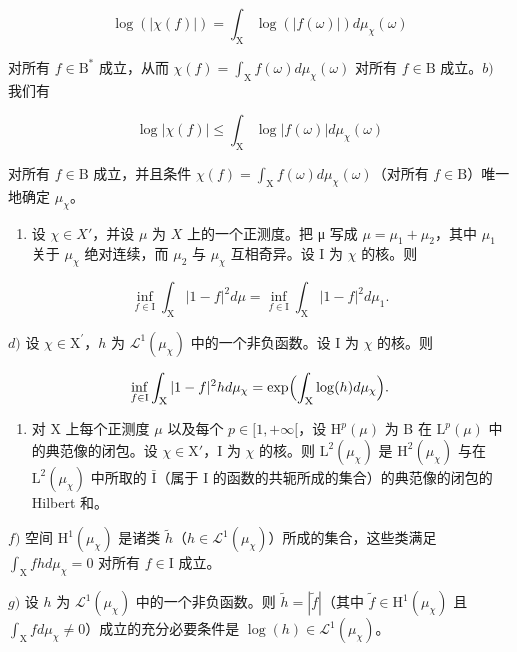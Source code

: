 \[
\log (| \chi (f) |) = \int_ {\mathrm{X}} \log (| f (\omega) |) d \mu_ {\chi} (\omega)
\]

对所有 \(f \in \mathrm{B}^*\) 成立，从而 \(\chi(f) = \int_{\mathrm{X}} f(\omega) d\mu_{\chi}(\omega)\) 对所有 \(f \in \mathrm{B}\) 成立。\(b)\) 我们有

\[
\log | \chi (f) | \leqslant \int_ {\mathrm{X}} \log | f (\omega) | d \mu_ {\chi} (\omega)
\]

对所有 \(f \in \mathrm{B}\) 成立，并且条件 \(\chi(f) = \int_{\mathrm{X}} f(\omega) d\mu_{\chi}(\omega)\)（对所有 \(f \in \mathrm{B}\)）唯一地确定 \(\mu_{\chi}\)。

\begin{enumerate}
\def\labelenumi{\alph{enumi})}
\setcounter{enumi}{2}
\tightlist
\item
  设 \(\chi \in X'\)，并设 \(\mu\) 为 \(X\) 上的一个正测度。把 μ 写成 \(\mu = \mu_1 + \mu_2\)，其中 \(\mu_1\) 关于 \(\mu_{\chi}\) 绝对连续，而 \(\mu_2\) 与 \(\mu_{\chi}\) 互相奇异。设 I 为 \(\chi\) 的核。则
\end{enumerate}

\[
\inf _ {f \in \mathrm{I}} \int_ {\mathrm{X}} | 1 - f | ^ {2} d \mu = \inf _ {f \in \mathrm{I}} \int_ {\mathrm{X}} | 1 - f | ^ {2} d \mu_ {1}.
\]

\(d)\) 设 \(\chi\in\mathrm{X}^{\prime}\)，\(h\) 为 \(\mathcal{L}^{1}(\mu_{\chi})\) 中的一个非负函数。设 I 为 \(\chi\) 的核。则

\[
\inf _ {f \in \mathrm{I}} \int_ {\mathrm{X}} | 1 - f | ^ {2} h d \mu_ {\chi} = \exp \Bigl (\int_ {\mathrm{X}} \log (h) d \mu_ {\chi} \Bigr).
\]

\begin{enumerate}
\def\labelenumi{\alph{enumi})}
\setcounter{enumi}{4}
\tightlist
\item
  对 X 上每个正测度 \(\mu\) 以及每个 \(p \in [1, +\infty[\)，设 \(\mathrm{H}^p(\mu)\) 为 B 在 \(\mathrm{L}^p(\mu)\) 中的典范像的闭包。设 \(\chi \in \mathrm{X}'\)，I 为 \(\chi\) 的核。则 \(\mathrm{L}^2(\mu_\chi)\) 是 \(\mathrm{H}^2(\mu_\chi)\) 与在 \(\mathrm{L}^2(\mu_\chi)\) 中所取的 \(\bar{\mathrm{I}}\)（属于 I 的函数的共轭所成的集合）的典范像的闭包的 Hilbert 和。
\end{enumerate}

\(f)\) 空间 \(\mathrm{H}^1 (\mu_\chi)\) 是诸类 \(\widetilde{h}\)（\(h\in \mathcal{L}^1 (\mu_\chi)\)）所成的集合，这些类满足 \(\int_{\mathrm{X}}fh  d\mu_{\chi} = 0\) 对所有 \(f\in \mathrm{I}\) 成立。

\(g)\) 设 \(h\) 为 \(\mathcal{L}^1 (\mu_\chi)\) 中的一个非负函数。则 \(\widetilde{h} = |\widetilde{f}|\)（其中 \(\widetilde{f}\in \mathrm{H}^1 (\mu_\chi)\) 且 \(\int_{\mathrm{X}}f  d\mu_{\chi}\neq 0\)）成立的充分必要条件是 \(\log (h)\in \mathcal{L}^1 (\mu_\chi)\)。

